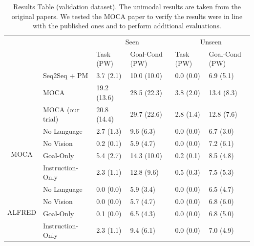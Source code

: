 \documentclass[11pt,a4paper]{article}
\begin{document}



\begin{table}[]
\begin{tabular}{ll|l|l|l|l|}
\cline{3-6}
                                              &                  & \multicolumn{2}{c|}{Seen}    & \multicolumn{2}{c|}{Unseen} \\ \cline{3-6} 
                                              &                  & Task (PW)   & Goal-Cond (PW) & Task (PW)  & Goal-Cond (PW) \\ \cline{2-6} 
\multicolumn{1}{l|}{}                         & Seq2Seq + PM     & 3.7 (2.1)   & 10.0 (10.0)    & 0.0 (0.0)  & 6.9 (5.1)      \\ \cline{2-6} 
\multicolumn{1}{l|}{}                         & MOCA             & 19.2 (13.6) & 28.5 (22.3)    & 3.8 (2.0)  & 13.4 (8.3)     \\ \cline{2-6} 
\multicolumn{1}{l|}{}                         & MOCA (our trial) & 20.8 (14.4) & 29.7 (22.6)    & 2.8 (1.4)  & 12.8 (7.6)     \\ \hline
\multicolumn{1}{|c|}{\multirow{4}{*}{MOCA}}   & No Language      & 2.7 (1.3)   & 9.6 (6.3)      & 0.0 (0.0)  & 6.7 (3.0)      \\ \cline{2-6} 
\multicolumn{1}{|c|}{}                        & No Vision        & 0.2 (0.1)   & 5.9 (4.7)      & 0.0 (0.0)  & 7.2 (6.1)      \\ \cline{2-6} 
\multicolumn{1}{|c|}{}                        & Goal-Only        & 5.4 (2.7)   & 14.3 (10.0)    & 0.2 (0.1)  & 8.5 (4.8)      \\ \cline{2-6} 
\multicolumn{1}{|c|}{}                        & Instruction-Only & 2.3 (1.1)   & 12.8 (9.6)     & 0.5 (0.3)  & 7.5 (5.3)      \\ \hline
\multicolumn{1}{|l|}{\multirow{4}{*}{ALFRED}} & No Language      & 0.0 (0.0)   & 5.9 (3.4)      & 0.0 (0.0)  & 6.5 (4.7)      \\ \cline{2-6} 
\multicolumn{1}{|l|}{}                        & No Vision        & 0.0 (0.0)   & 5.7 (4.7)      & 0.0 (0.0)  & 6.8 (6.0)      \\ \cline{2-6} 
\multicolumn{1}{|l|}{}                        & Goal-Only        & 0.1 (0.0)   & 6.5 (4.3)      & 0.0 (0.0)  & 6.8 (5.0)      \\ \cline{2-6} 
\multicolumn{1}{|l|}{}                        & Instruction-Only & 2.3 (1.1)   & 9.4 (6.1)      & 0.0 (0.0)  & 7.0 (4.9)      \\ \hline
\end{tabular}
\caption{Results Table (validation dataset). The unimodal results are taken from the original papers. We tested the MOCA paper to verify the results were in line with the published ones and to perform additional evaluations.}
\label{tab:results}
\end{table}
\end{document}
